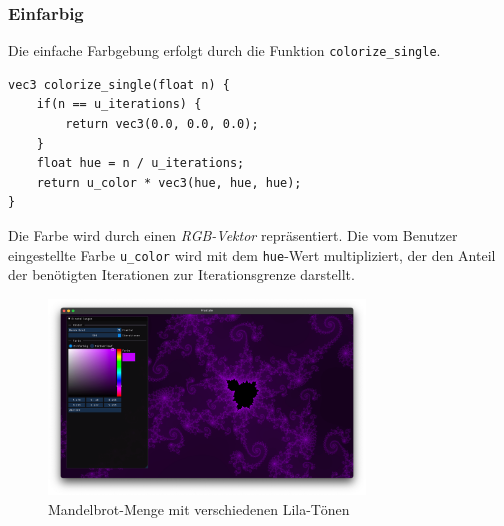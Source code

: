 
\subsubsection{Einfarbig}
Die einfache Farbgebung erfolgt durch die Funktion \texttt{colorize\_single}.
\begin{verbatim} 
vec3 colorize_single(float n) {
    if(n == u_iterations) {
        return vec3(0.0, 0.0, 0.0);
    }
    float hue = n / u_iterations;
    return u_color * vec3(hue, hue, hue);
}
\end{verbatim}
Die Farbe wird durch einen \textit{RGB-Vektor} repräsentiert. Die vom Benutzer
eingestellte Farbe \texttt{u\_color} wird mit dem \texttt{hue}-Wert
multipliziert, der den Anteil der benötigten Iterationen zur Iterationsgrenze
darstellt.
\begin{figure}[H]
    \centering
    \includegraphics[width=0.75\textwidth]{img/MandelbrotSingle.png}
    \caption{Mandelbrot-Menge mit verschiedenen Lila-Tönen}
\end{figure}

